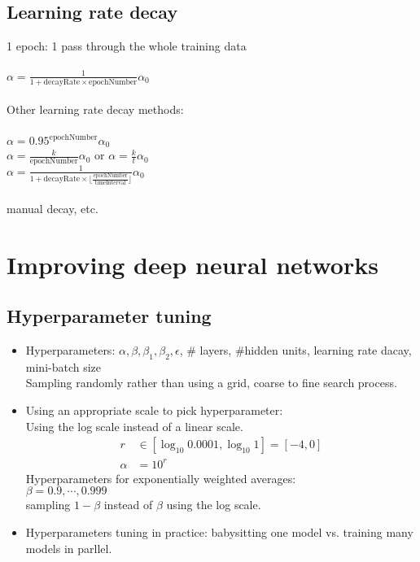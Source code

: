 %
\subsection{Learning rate decay}
1 epoch: 1 pass through the whole training data\\\\
$\displaystyle \alpha = \frac{1}{1 + \text{decayRate} \times \text{epochNumber}} \alpha_0$\\
\\
Other learning rate decay methods:\\\\
$\displaystyle \alpha = 0.95^{\text{epochNumber}} \alpha_0$\\
$\displaystyle \alpha = \frac{k}{\text{epochNumber}} \alpha_0$ or $\alpha = \frac{k}{t} \alpha_0$\\
$\displaystyle \alpha = \frac{1}{1 + \text{decayRate} \times \lfloor\frac{\text{epochNumber}}{\text{timeInterval}}\rfloor} \alpha_0$\\\\
manual decay, etc.


\section{Improving deep neural networks}

%
\subsection{Hyperparameter tuning}
\begin{itemize}
\item
Hyperparameters: $\alpha, \beta, \beta_1, \beta_2, \epsilon$, \# layers, \#hidden units, learning rate dacay, mini-batch size\\
Sampling randomly rather than using a grid, coarse to fine search process.
\item
Using an appropriate scale to pick hyperparameter:\\
Using the log scale instead of a linear scale.
\begin{align*}
r & \in [\log_{10}0.0001, \log_{10}1] = [-4, 0]\\
\alpha & = 10^r
\end{align*}
Hyperparameters for exponentially weighted averages:\\
$\beta = 0.9, \cdots, 0.999$\\
sampling $1 -\beta$ instead of $\beta$ using the log scale.
\item
Hyperparameters tuning in practice: babysitting one model vs. training many models in parllel.\\
\end{itemize}

